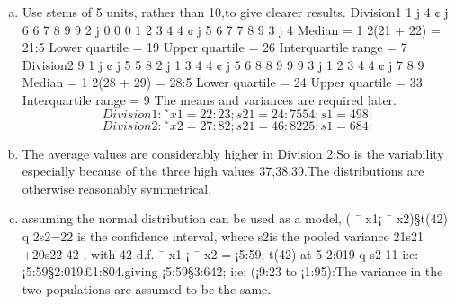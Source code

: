 \documentclass[a4paper,12pt]{article}
\begin{document}
\begin{enumerate}[(a)]
    \item  Use stems of 5 units, rather than 10,to give clearer results.
Division1
1 j 4
¢ j 6 6 7 8 9 9
2 j 0 0 0 1 2 3 4 4
¢ j 5 6 7 7 8 9
3 j 4
Median = 1
2(21 + 22) = 21:5
Lower quartile = 19
Upper quartile = 26
Interquartile range = 7
Division2
9
1 j
¢ j 5 5 8
2 j 1 3 4 4
¢ j 5 6 8 8 9 9 9
3 j 1 2 3 4 4
¢ j 7 8 9
Median = 1
2(28 + 29) = 28:5
Lower quartile = 24
Upper quartile = 33
Interquartile range = 9
The means and variances are required later.
\[Division1 : ˜ x1 = 22:23; s21
= 24:7554; s1 = 498:\]
\[Division2 : ˜ x2 = 27:82; s21
= 46:8225; s1 = 684:\]
\item The average values are considerably higher in Division 2;So is the variability
especially because of the three high values 37,38,39.The distributions are otherwise reasonably
symmetrical.
\item assuming the normal distribution can be used as a model, ( ¯ x1¡ ¯ x2)§t(42)
q
2s2=22
is the confidence interval, where s2is the pooled variance 21s21
+20s22
42 , with 42 d.f. ¯ x1 ¡
¯ x2 = ¡5:59; t(42) at 5%
2:019
q
s2
11 i:e: ¡5:59§2:019£1:804.giving ¡5:59§3:642; i:e: (¡9:23 to ¡1:95):The
variance in the two populations are assumed to be the same.
\end{enumerate}
\end{document}
